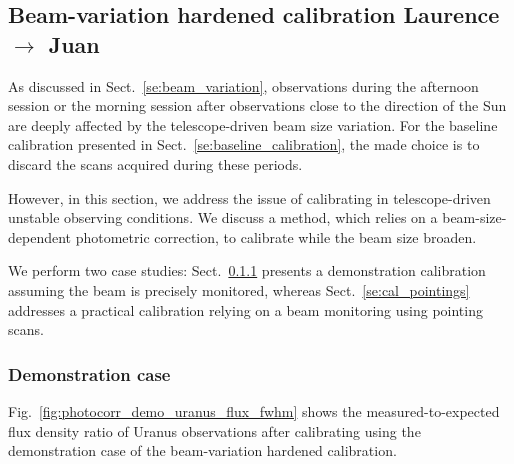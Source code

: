 \subsection{Beam-variation hardened calibration {\color{blue} Laurence $\rightarrow$ Juan} }

As discussed in Sect.~\ref{se:beam_variation}, observations during the
afternoon session or the morning session after observations close to the
direction of the Sun are deeply affected by the telescope-driven beam
size variation. For the baseline calibration presented in
Sect.~\ref{se:baseline_calibration}, the made choice is to discard the
scans acquired during these periods.

However, in this section, we address the issue of calibrating in
telescope-driven unstable observing conditions. We discuss a method,
which relies on a beam-size-dependent photometric correction, to
calibrate while the beam size broaden.

We perform two case studies: Sect.~\ref{se:cal_democase} presents a demonstration
calibration assuming the beam is precisely monitored, whereas
Sect.~\ref{se:cal_pointings} addresses a practical calibration relying
on a beam monitoring using pointing scans. 


\subsubsection{Demonstration case}
\label{se:cal_democase}


Fig.~\ref{fig:photocorr_demo_uranus_flux_fwhm} shows the
measured-to-expected flux density ratio of Uranus observations after
calibrating using the demonstration case of the beam-variation
hardened calibration. 

